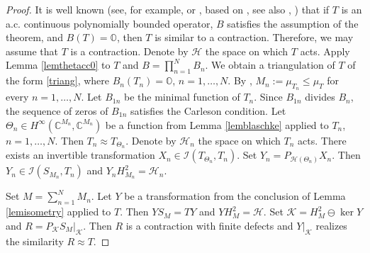 \documentclass[a4paper,oneside,11pt]{amsart}
\numberwithin{equation}{section}
\theoremstyle{plain}
\theoremstyle{definition}
\begin{document}
\begin{proof} It is well known (see, for example, {\cite[Theorem 4.4]{clouatre14}} or {\cite[Theorem 3.2]{gamal17}}, 
based on  
\cite{vas}, see also {\cite[Ch. IX]{nik86}}, {\cite[Sec. C.3]{nik02}})
that if $T$ is an a.c. continuous polynomially bounded operator,  
$B$ satisfies   the assumption of the theorem,  and 
$B(T)=\mathbb O$, then $T$ is similar to a contraction. Therefore, 
 we may assume that $T$ is a contraction.  Denote by $\mathcal H$ the space on which $T$ acts. 
Apply Lemma \ref{lemthetacc0}  to $T$ and $B=\prod_{n=1}^N B_n$. We obtain 
   a triangulation of $T$ of the form \eqref{triang},  
where $B_n(T_n)=\mathbb O$,  $n=1,\ldots, N$. By {\cite[Corollaries III.5.26 and III.5.27]{berc}},
$M_n:=\mu_{T_n}\leq\mu_T$ for every $n=1,\ldots, N$. 
Let $B_{1n}$ be the minimal function of $T_n$. Since $B_{1n}$ divides $B_n$, the sequence of zeros of $B_{1n}$ satisfies  the Carleson condition. 
Let $\Theta_n\in H^\infty(\mathbb C^{M_n},\mathbb C^{M_n})$ be a  function from  Lemma \ref{lemblaschke} applied to $T_n$, $n=1,\ldots, N$. 
Then $T_n\approx T_{\Theta_n}$. Denote by $\mathcal H_n$ the space on which $T_n$ acts. 
 There exists an invertible transformation $X_n\in\mathcal I(T_{\Theta_n},T_n)$.
 Set $Y_n=P_{\mathcal H(\Theta_n)}X_n$. 
Then $Y_n\in\mathcal I(S_{M_n},T_n)$ 
 and  $Y_n H^2_{M_n}=\mathcal H_n$. 

Set $M=\sum_{n=1}^N M_n$. Let  $Y$ 
 be a transformation 
 from the conclusion of Lemma \ref{lemisometry} applied to $T$. Then 
 $Y S_M=T Y$ and $Y H^2_M=\mathcal H$. 
Set 
  $\mathcal K=H^2_M\ominus\ker Y$ and $R=P_{\mathcal K} S_M|_{\mathcal K}$. 
Then $R$ is a contraction with finite defects and $Y|_{\mathcal K}$ realizes the similarity $R\approx T$. 
\end{proof}
\end{document}

